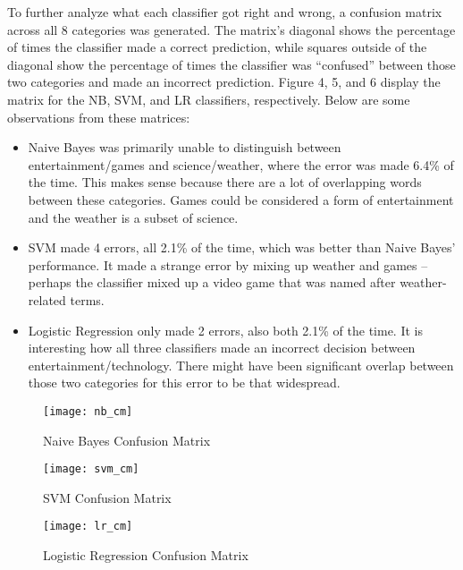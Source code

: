 \documentclass[twocolumn]{article}
\begin{document}
To further analyze what each classifier got right and wrong, a confusion matrix across all 8 categories was generated. The matrix's diagonal shows the percentage of times the classifier made a correct prediction, while squares outside of the diagonal show the percentage of times the classifier was ``confused'' between those two categories and made an incorrect prediction. Figure 4, 5, and 6 display the matrix for the NB, SVM, and LR classifiers, respectively. Below are some observations from these matrices:
\begin{itemize}
    \itemsep 0em
    \item Naive Bayes was primarily unable to distinguish between entertainment/games and science/weather, where the error was made 6.4\% of the time. This makes sense because there are a lot of overlapping words between these categories. Games could be considered a form of entertainment and the weather is a subset of science.
    \item SVM made 4 errors, all 2.1\% of the time, which was better than Naive Bayes’ performance. It made a strange error by mixing up weather and games – perhaps the classifier mixed up a video game that was named after weather-related terms.
    \item Logistic Regression only made 2 errors, also both 2.1\% of the time. It is interesting how all three classifiers made an incorrect decision between entertainment/technology. There might have been significant overlap between those two categories for this error to be that widespread.
\end{itemize}

\begin{figure}
    \centering
    \texttt{[image: nb\_cm]}
    \caption{Naive Bayes Confusion Matrix}
\end{figure}

\begin{figure}
    \centering
    \texttt{[image: svm\_cm]}
    \caption{SVM Confusion Matrix}
\end{figure}

\begin{figure}
    \centering
    \texttt{[image: lr\_cm]}
    \caption{Logistic Regression Confusion Matrix}
\end{figure}
\end{document}
